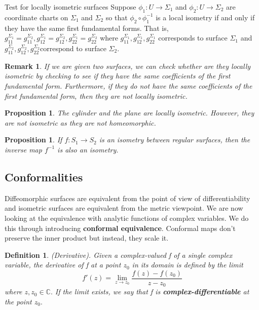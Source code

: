 \documentclass[twoside]{article}
\newtheorem{proposition}[theorem]{Proposition}
\newtheorem{definition}[theorem]{Definition}
\newtheorem{remark}[theorem]{Remark}
\begin{document}
\begin{proposition_exam}{Test for locally isometric surfaces}{} Suppose $\phi_1: U \rightarrow \Sigma_1$ and $\phi_2: U \rightarrow \Sigma_2$ are coordinate charts on $\Sigma_1$ and $\Sigma_2$ so that $\phi_2 \circ \phi_{1}^{-1}$ is a local isometry if and only if they have the same first fundamental forms. That is, $g_{11}^{\Sigma_1} = g_{11}^{\Sigma_2}, g_{12}^{\Sigma_1} = g_{12}^{\Sigma_2}, g_{22}^{\Sigma_1} = g_{22}^{\Sigma_2}$ where $g_{11}^{\Sigma_1},g_{12}^{\Sigma_1},g_{22}^{\Sigma_1}$ corresponds to surface $\Sigma_1$ and $g_{11}^{\Sigma_2},g_{12}^{\Sigma_2},g_{22}^{\Sigma_2}$correspond to surface $\Sigma_2.$
\end{proposition_exam}


\begin{remark}If we are given two surfaces, we can check whether are they locally isometric by checking to see if they have the same coefficients of the first fundamental form. Furthermore, if they do not have the same coefficients of the first fundamental form, then they are not locally isometric.
\end{remark}

\begin{proposition}The cylinder and the plane are locally isometric. However, they are not isometric as they are not homeomorphic.
\end{proposition}

\begin{proposition}If $f: S_1 \rightarrow S_2$ is an isometry between regular surfaces, then the inverse map $f^{-1}$ is also an isometry.
\end{proposition}

\subsection{Conformalities}
Diffeomorphic surfaces are equivalent from the point of view of differentiability and isometric surfaces are equivalent from the metric viewpoint. We are now looking at the equivalence with analytic functions of complex variables. We do this through introducing \textbf{conformal equivalence}. Conformal maps don't preserve the inner product but instead, they scale it.

\begin{definition}(Derivative). Given a complex-valued f of a single complex variable, the derivative of f at a point $z_0$ in its domain is defined by the limit 
$$
f'(z) = \lim_{z \rightarrow z_0}\frac{f(z) - f(z_0)}{z - z_0}
$$
where $z, z_0 \in \mathbb{C}.$ If the limit exists, we say that f is \textbf{complex-differentiable} at the point $z_0.$
\end{definition}
\end{document}
